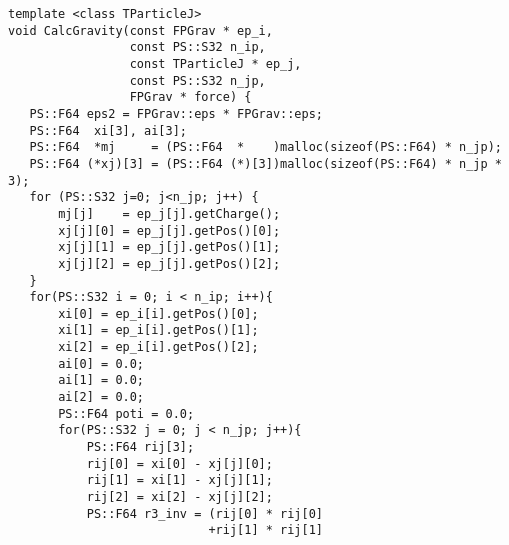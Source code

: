 \documentclass[10pt,twocolumn,a4paper,fleqn]{article}
\begin{document}

\begin{mdframed}[
    backgroundcolor=bg,
    topline=false,
    bottomline=false,
    leftline=false,
    rightline=false]
\begin{verbatim}
template <class TParticleJ>                   
void CalcGravity(const FPGrav * ep_i,         
                 const PS::S32 n_ip,          
                 const TParticleJ * ep_j,     
                 const PS::S32 n_jp,          
                 FPGrav * force) {            
   PS::F64 eps2 = FPGrav::eps * FPGrav::eps;                                  
   PS::F64  xi[3], ai[3];                                                     
   PS::F64  *mj     = (PS::F64  *    )malloc(sizeof(PS::F64) * n_jp);         
   PS::F64 (*xj)[3] = (PS::F64 (*)[3])malloc(sizeof(PS::F64) * n_jp * 3);     
   for (PS::S32 j=0; j<n_jp; j++) {                                           
       mj[j]    = ep_j[j].getCharge();                                        
       xj[j][0] = ep_j[j].getPos()[0];                                        
       xj[j][1] = ep_j[j].getPos()[1];                                        
       xj[j][2] = ep_j[j].getPos()[2];                                        
   }                                                                          
   for(PS::S32 i = 0; i < n_ip; i++){                                         
       xi[0] = ep_i[i].getPos()[0];                                           
       xi[1] = ep_i[i].getPos()[1];                                           
       xi[2] = ep_i[i].getPos()[2];                                           
       ai[0] = 0.0;                                                           
       ai[1] = 0.0;                                                           
       ai[2] = 0.0;                                                           
       PS::F64 poti = 0.0;                                                    
       for(PS::S32 j = 0; j < n_jp; j++){                                     
           PS::F64 rij[3];                                                    
           rij[0] = xi[0] - xj[j][0];                                         
           rij[1] = xi[1] - xj[j][1];                                         
           rij[2] = xi[2] - xj[j][2];                                         
           PS::F64 r3_inv = (rij[0] * rij[0]                                  
                            +rij[1] * rij[1]                                  

\end{verbatim}
\end{mdframed}
\end{document}
